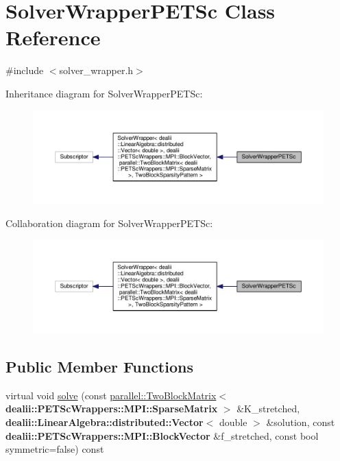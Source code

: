 \hypertarget{class_solver_wrapper_p_e_t_sc}{}\section{Solver\+Wrapper\+P\+E\+T\+Sc Class Reference}
\label{class_solver_wrapper_p_e_t_sc}


{\ttfamily \#include $<$solver\+\_\+wrapper.\+h$>$}



Inheritance diagram for Solver\+Wrapper\+P\+E\+T\+Sc\+:\nopagebreak
\begin{figure}[H]
\begin{center}
\leavevmode
\includegraphics[width=350pt]{class_solver_wrapper_p_e_t_sc__inherit__graph}
\end{center}
\end{figure}


Collaboration diagram for Solver\+Wrapper\+P\+E\+T\+Sc\+:\nopagebreak
\begin{figure}[H]
\begin{center}
\leavevmode
\includegraphics[width=350pt]{class_solver_wrapper_p_e_t_sc__coll__graph}
\end{center}
\end{figure}
\subsection*{Public Member Functions}
\begin{DoxyCompactItemize}
\item 
virtual void \hyperlink{class_solver_wrapper_p_e_t_sc_ac1033bb655ccc7459c4549e5ae4988c5}{solve} (const \hyperlink{classparallel_1_1_two_block_matrix}{parallel\+::\+Two\+Block\+Matrix}$<$ {\bf dealii\+::\+P\+E\+T\+Sc\+Wrappers\+::\+M\+P\+I\+::\+Sparse\+Matrix} $>$ \&K\+\_\+stretched, {\bf dealii\+::\+Linear\+Algebra\+::distributed\+::\+Vector}$<$ double $>$ \&solution, const {\bf dealii\+::\+P\+E\+T\+Sc\+Wrappers\+::\+M\+P\+I\+::\+Block\+Vector} \&f\+\_\+stretched, const bool symmetric=false) const 
\end{DoxyCompactItemize}


